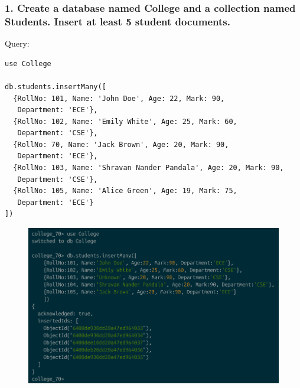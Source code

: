 \documentclass{article}
\begin{document}
\subsubsection*{1. Create a database named College and a collection named Students. Insert at least 5 student documents.}
Query:
\begin{Verbatim}[frame=single,framerule=1pt,fontfamily=courier,fontsize=\small]
use College

db.students.insertMany([
  {RollNo: 101, Name: 'John Doe', Age: 22, Mark: 90, 
   Department: 'ECE'},
  {RollNo: 102, Name: 'Emily White', Age: 25, Mark: 60, 
   Department: 'CSE'},
  {RollNo: 70, Name: 'Jack Brown', Age: 20, Mark: 90, 
   Department: 'ECE'},
  {RollNo: 103, Name: 'Shravan Nander Pandala', Age: 20, Mark: 90, 
   Department: 'CSE'},
  {RollNo: 105, Name: 'Alice Green', Age: 19, Mark: 75, 
   Department: 'ECE'}
])
\end{Verbatim}
\begin{figure}[H]
    \centering
    \includegraphics[width=\textwidth]{cycle7/7.1.png}
\end{figure}
\end{document}
